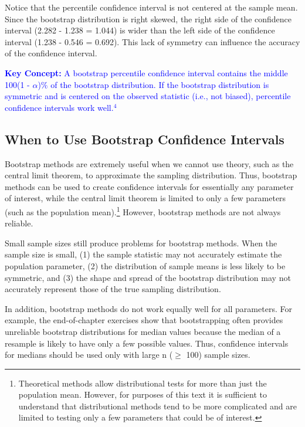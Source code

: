 \documentclass[
]{report}
\begin{document}
Notice that the percentile confidence interval is not centered at the sample mean. Since the bootstrap distribution is right skewed, the right side of the confidence interval (2.282 - 1.238 = 1.044) is wider than the left side of the confidence interval (1.238 - 0.546 = 0.692). This lack of symmetry can influence the accuracy of the confidence interval.

\textbf{\textcolor{blue}{Key Concept:}}
\textcolor{blue}{A bootstrap percentile confidence interval contains the middle 100(1 - $\scriptstyle \alpha$)$\%$ of the bootstrap distribution. If the bootstrap distribution is symmetric and is centered on the observed statistic (i.e., not biased), percentile confidence intervals work well.$^4$}

\hypertarget{when-to-use-bootstrap-confidence-intervals}{%
\subsection*{When to Use Bootstrap Confidence Intervals}\label{when-to-use-bootstrap-confidence-intervals}}

Bootstrap methods are extremely useful when we cannot use theory, such as the central limit theorem, to approximate the sampling distribution. Thus, bootstrap methods can be used to create confidence intervals for essentially any parameter of interest, while the central limit theorem is limited to only a few parameters (such as the population mean).\footnote{Theoretical methods allow distributional tests for more than just the population mean. However, for purposes of this text it is sufficient to understand that distributional methods tend to be more complicated and are limited to testing only a few parameters that could be of interest.} However, bootstrap methods are not always reliable.

Small sample sizes still produce problems for bootstrap methods. When the sample size is small, (1) the sample statistic may not accurately estimate the population parameter, (2) the distribution of sample means is less likely to be symmetric, and (3) the shape and spread of the bootstrap distribution may not accurately represent those of the true sampling distribution.

In addition, bootstrap methods do not work equally well for all parameters. For example, the end-of-chapter exercises show that bootstrapping often provides unreliable bootstrap distributions for median values because the median of a resample is likely to have only a few possible values. Thus, confidence intervals for medians should be used only with large n (\(\scriptstyle \geq\) 100) sample sizes.
\end{document}
